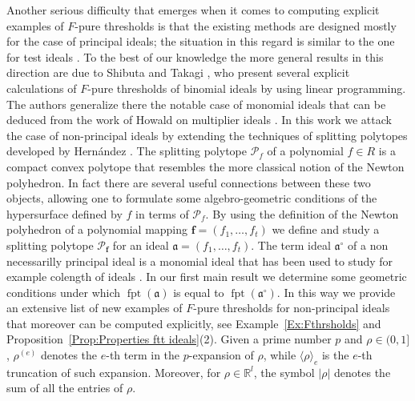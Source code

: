 \documentclass[12pt]{amsart}
\theoremstyle{definition}
\numberwithin{equation}{subsection}
\DeclareMathOperator{\fpt}{fpt}
\newcommand{\RR}{\mathbb{R}}
\newcommand{\fa}{\mathfrak{a}}
\newcommand{\SP}{\mathcal{P}}
\newcommand{\Bf}{\boldsymbol{f}}
\renewcommand{\!}[1]{{\color{red}\text{\Huge$\star$ }#1}}
\begin{document}
Another serious difficulty that emerges when it comes to computing explicit examples of $F$-pure thresholds is that the existing methods are designed mostly for the case of principal ideals; the situation in this regard is similar to the one for test ideals \cite{ScTu2014}. To the best of our knowledge the more general results in this direction are due to Shibuta and Takagi \cite{ShTa}, who present several explicit calculations of 
$F$-pure thresholds of binomial ideals by using linear programming. The authors generalize there the notable case of monomial ideals that can be deduced from the work of Howald on multiplier ideals \cite{How}. In this work we attack the case of non-principal ideals by extending the techniques of splitting polytopes developed by Hern\'andez \cite{HDbinomial,HDpolynomials}. The splitting polytope $\SP_f$ of a polynomial $f\in R$ is a compact convex polytope that resembles the more classical notion of the Newton polyhedron. In fact there are several useful connections between these two objects, allowing one to formulate some algebro-geometric conditions of the hypersurface defined by $f$ in terms of $\SP_{f}$. By using the definition of the Newton polyhedron of a polynomial mapping $\Bf=(f_1,\ldots,f_t)$ \cite{VeZu,LeVeZu} we define and study a splitting polytope $\SP_{\Bf}$ for an ideal $\fa=(f_1,\ldots,f_t)$. The term ideal $\fa^\circ$ of a non necessarilly principal ideal is a monomial ideal that has been used to study for example colength of ideals \cite{BiFuSa}. In our first main result we determine some geometric conditions under which  $\fpt(\fa)$ is equal to $\fpt(\fa^\circ)$. In this way we provide an extensive list of new examples of $F$-pure thresholds for non-principal ideals that moreover can be computed explicitly, see Example~\ref{Ex:Fthrsholds} and Proposition~\ref{Prop:Properties ftt ideals}(2). Given a prime number $p$ and $\rho\in(0,1]$,  $\rho^{(e)}$ denotes the $e$-th term in the $p$-expansion of $\rho$, while $\langle \rho \rangle_e$ is the $e$-th truncation of such expansion. Moreover, for $\rho\in\RR^l$, the symbol $|\rho|$ denotes the sum of all the entries of $\rho$. 
\end{document}
